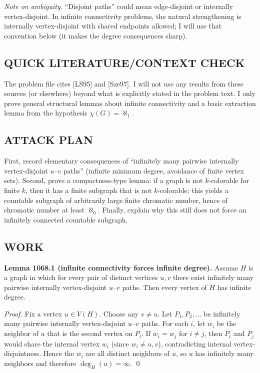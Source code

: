 \emph{Note on ambiguity.} ``Disjoint paths'' could mean edge-disjoint or internally vertex-disjoint.  In infinite connectivity problems, the natural strengthening is internally vertex-disjoint with shared endpoints allowed; I will use that convention below (it makes the degree consequences sharp).

\subsection*{QUICK LITERATURE/CONTEXT CHECK}
The problem file cites [LS95] and [Sze97].  I will not use any results from these sources (or elsewhere) beyond what is explicitly stated in the problem text.  I only prove general structural lemmas about infinite connectivity and a basic extraction lemma from the hypothesis $\chi(G)=\aleph_1$.

\subsection*{ATTACK PLAN}
First, record elementary consequences of ``infinitely many pairwise internally vertex-disjoint $u$--$v$ paths'' (infinite minimum degree, avoidance of finite vertex sets).  Second, prove a compactness-type lemma: if a graph is not $k$-colorable for finite $k$, then it has a finite subgraph that is not $k$-colorable; this yields a countable subgraph of arbitrarily large finite chromatic number, hence of chromatic number at least $\aleph_0$.  Finally, explain why this still does not force an infinitely connected countable subgraph.

\subsection*{WORK}
\textbf{Lemma 1068.1 (infinite connectivity forces infinite degree).}
Assume $H$ is a graph in which for every pair of distinct vertices $u,v$ there exist infinitely many pairwise internally vertex-disjoint $u$--$v$ paths.
Then every vertex of $H$ has infinite degree.

\emph{Proof.}
Fix a vertex $u\in V(H)$. Choose any $v\ne u$.
Let $P_1,P_2,\ldots$ be infinitely many pairwise internally vertex-disjoint $u$--$v$ paths.
For each $i$, let $w_i$ be the neighbor of $u$ that is the second vertex on $P_i$.
If $w_i=w_j$ for $i\ne j$, then $P_i$ and $P_j$ would share the internal vertex $w_i$ (since $w_i\ne u,v$), contradicting internal vertex-disjointness.
Hence the $w_i$ are all distinct neighbors of $u$, so $u$ has infinitely many neighbors and therefore $\deg_H(u)=\infty$.
\qed

